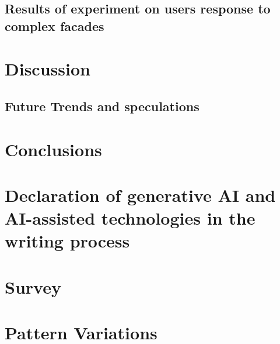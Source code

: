 \documentclass[final,5p,times]{elsarticle}
\begin{document}
\begin{linenumbers}
    \subsection{Results of experiment on users response to complex facades}
    \label{subsec:ResultsExperiment}
    

\section{Discussion}
\label{sec:Discussion}


    \subsection{Future Trends and speculations}
    \label{subsec:Futuretrends}
    

\section{Conclusions}
\label{sec:Conclusion}


\section{Declaration of generative AI and AI-assisted technologies in the writing process}
\label{sec:Declaration AI}


\end{linenumbers}

\newpage
\clearpage

\appendix
\section{Survey}
\label{sec:Annexsurvey}


\section{Pattern Variations}
\label{sec:AnnexVariations}



\pagebreak
\clearpage



\end{document}
